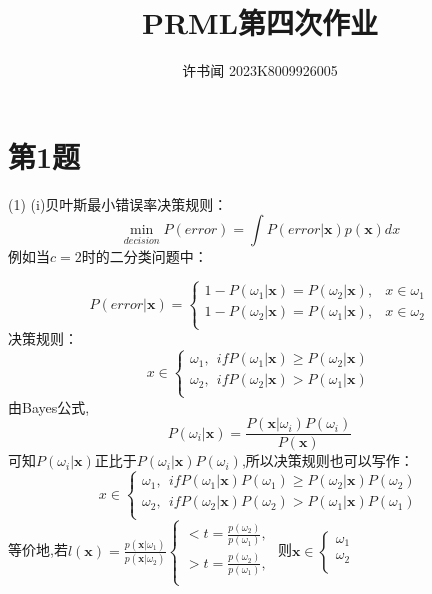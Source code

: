 \documentclass{article}
\begin{document}
\title{PRML第四次作业}
\author{许书闻 2023K8009926005}
\maketitle

\section*{第1题}
(1)
(i)贝叶斯最小错误率决策规则：
\[\min_{decision}P(error)=\int P(error|\boldsymbol{x})p(\boldsymbol{x})dx\]
例如当$c=2$时的二分类问题中：

\[P(error|\boldsymbol{x})=
\begin{cases}
    1-P(\omega_1|\boldsymbol{x})=P(\omega_2|\boldsymbol{x}),&x\in \omega_1\\
    1-P(\omega_2|\boldsymbol{x})=P(\omega_1|\boldsymbol{x}),&x\in \omega_2\\
\end{cases}
\]
决策规则：
\[x \in
\begin{cases}
    \omega_1,~~if P(\omega_1|\boldsymbol{x})\geq P(\omega_2|\boldsymbol{x})\\
    \omega_2,~~if P(\omega_2|\boldsymbol{x})> P(\omega_1|\boldsymbol{x})\\
\end{cases}
\]
由Bayes公式,\[P(\omega_i|\boldsymbol{x})=\frac{P(\boldsymbol{x}|\omega_i)P(\omega_i)}{P(\boldsymbol{x})}\]可知\(P(\omega_i|\boldsymbol{x})\)正比于\(P(\omega_i|\boldsymbol{x})P(\omega_i)\),所以决策规则也可以写作：
\[x \in
\begin{cases}
    \omega_1,~~if P(\omega_1|\boldsymbol{x})P(\omega_1)\geq P(\omega_2|\boldsymbol{x})P(\omega_2)\\
    \omega_2,~~if P(\omega_2|\boldsymbol{x})P(\omega_2)> P(\omega_1|\boldsymbol{x})P(\omega_1)\\
\end{cases}
\]
等价地,若\(l(\boldsymbol{x})=\frac{p(\boldsymbol{x}|\omega_1)}{p(\boldsymbol{x}|\omega_2)}
\begin{cases}
    <t=\frac{p(\omega_2)}{p(\omega_1)},\\
    >t=\frac{p(\omega_2)}{p(\omega_1)},\\
\end{cases}\)
则\(\boldsymbol{x}\in
\begin{cases}
\omega_1\\
\omega_2\\
\end{cases} 
\)
\end{document}
